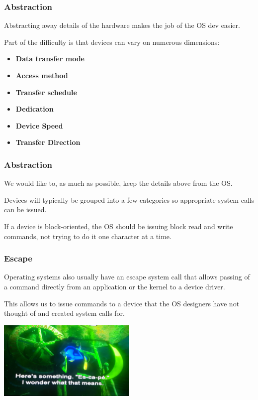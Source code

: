 \begin{frame}
\frametitle{Abstraction}

Abstracting away details of the hardware makes the job of the OS dev easier.

Part of the difficulty is that devices can vary on numerous dimensions:

\begin{itemize}
\item \textbf{Data transfer mode}
\item \textbf{Access method}
\item \textbf{Transfer schedule}
\item \textbf{Dedication}
\item \textbf{Device Speed}
\item \textbf{Transfer Direction}
\end{itemize}

\end{frame}

\begin{frame}
\frametitle{Abstraction}

We would like to, as much as possible, keep the details above from the OS.

Devices will typically be grouped into a few categories so appropriate system calls can be issued. 

If a device is block-oriented, the OS should be issuing block read and write commands, not trying to do it one character at a time.


\end{frame}

\begin{frame}
\frametitle{Escape}

Operating systems also usually have an \alert{escape} system call that allows passing of a command directly from an application or the kernel to a device driver. 

This allows us to issue commands to a device that the OS designers have not thought of and created system calls for. 

\begin{center}
	\includegraphics[width=0.5\textwidth]{images/escape-dory.jpg}
\end{center}

\end{frame}

